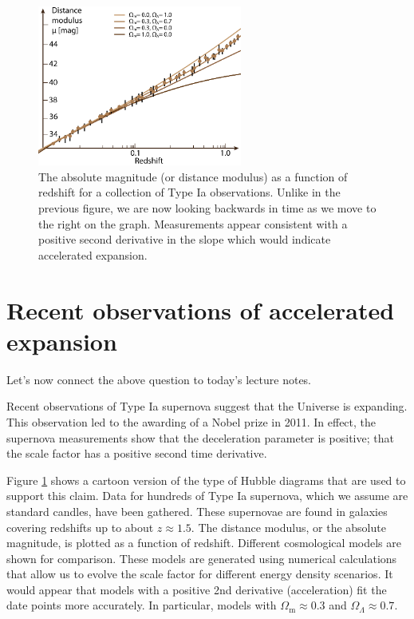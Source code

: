 \documentclass[a4paper,12pt]{article}
\theoremstyle{remark}
\newcommand{\mrm}[1]{\mathrm{#1}}
\renewcommand{\=}[1]{\stackrel{#1}{=}} %
\theoremstyle{plain}
\theoremstyle{definition}
\begin{document}
\begin{figure}[t]
\begin{center}
    \includegraphics*[angle=0,width=0.6\textwidth]{img/history_of_universe_zoomed.png}
    \caption[Distance modulus vs redshift]{The absolute magnitude (or distance modulus) as a function of redshift for a collection of Type Ia observations. Unlike in the previous figure, we are now looking backwards in time as we move to the right on the graph. Measurements appear consistent with a positive second derivative in the slope which would indicate accelerated expansion.}
\label{fig:acceleration}
\end{center}
\end{figure}

\section{Recent observations of accelerated expansion}
Let's now connect the above question to today's lecture notes. 

Recent observations of Type Ia supernova suggest that the Universe is expanding. This observation led to the awarding of a Nobel prize in 2011. In effect, the supernova measurements show that the deceleration parameter is positive; that the scale factor has a positive second time derivative.

Figure \ref{fig:acceleration} shows a cartoon version of the type of Hubble diagrams that are used to support this claim. Data for hundreds of Type Ia supernova, which we assume are standard candles, have been gathered. These supernovae are found in galaxies covering redshifts up to about $z\approx1.5$. The distance modulus, or the absolute magnitude, is plotted as a function of redshift. Different cosmological models are shown for comparison. These models are generated using numerical calculations that allow us to evolve the scale factor for different energy density scenarios. It would appear that models with a positive 2nd derivative (acceleration) fit the date points more accurately. In particular, models with $\Omega _\mrm{m} \approx 0.3$ and $\Omega _\Lambda \approx 0.7$.
 
\begingroup
%
%

%
\linespread{0.5}\selectfont

\endgroup
\end{document}
